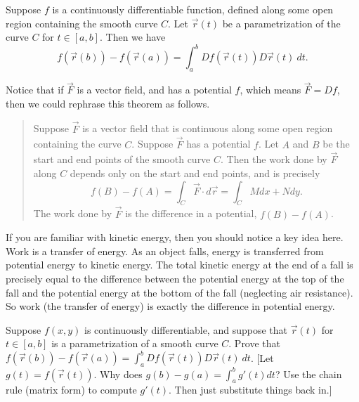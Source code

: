 \begin{theorem}
%
 Suppose $f$ is a continuously differentiable function, defined along some open region containing the smooth curve $C$. Let $\vec r(t)$ be a parametrization of the curve $C$ for $t\in[a,b]$. Then we have
$$f(\vec r(b))-f(\vec r(a))=\int_a^b Df(\vec r(t))D\vec r(t)\ dt.$$
\end{theorem}
Notice that if $\vec F$ is a vector field, and has a potential $f$, which means $\vec F = Df$, then we could rephrase this theorem as follows. 
\begin{quote}
 Suppose $\vec F$ is a vector field that is continuous along some open region containing the curve $C$. Suppose $\vec F$ has a potential $f$. Let $A$ and $B$ be the start and end points of the smooth curve $C$.  Then the work done by $\vec F$ along $C$ depends only on the start and end points, and is precisely
$$f(B)-f(A)=\int_C \vec F\cdot d\vec r = \int_C Mdx+Ndy.$$
 The work done by $\vec F$ is the difference in a potential, $f(B)-f(A)$.
\end{quote}
If you are familiar with kinetic energy, then you should notice a key idea here.  Work is a transfer of energy. As an object falls, energy is transferred from potential energy to kinetic energy.  The total kinetic energy at the end of a fall is precisely equal to the difference between the potential energy at the top of the fall and the potential energy at the bottom of the fall (neglecting air resistance). So work (the transfer of energy) is exactly the difference in potential energy.  

\begin{problem}
 Suppose $f(x,y)$ is continuously differentiable, and suppose that $\vec r(t)$ for $t\in[a,b]$ is a parametrization of a smooth curve $C$. Prove that $f(\vec r(b))-f(\vec r(a)) = \int_a^b Df(\vec r(t))D\vec r(t)\ dt$. [Let $g(t) = f(\vec r(t))$. Why does $g(b)-g(a) = \int_a^b g'(t)dt$? Use the chain rule (matrix form) to compute $g'(t)$. Then just substitute things back in.]  
\end{problem}

